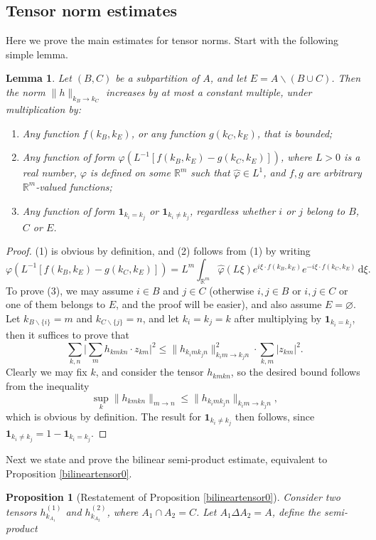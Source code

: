 \documentclass[11 pt,reqno]{amsart}
\newtheorem{prop}[thm]{Proposition}
\newtheorem{lem}[thm]{Lemma}
\theoremstyle{definition}
\theoremstyle{remark}
\numberwithin{equation}{section}
\newcommand{\Rb}{\mathbb{R}}
\begin{document}
{ \subsection{Tensor norm estimates}\label{multi} Here we prove the main estimates for tensor norms. Start with the following simple lemma.
 \begin{lem}\label{adjustment} Let $(B,C)$ be a subpartition of $A$, and let $E=A\backslash (B\cup C)$. Then the norm $\|h\|_{k_B\to k_C}$ increases by at most a constant multiple, under multiplication by:
 \begin{enumerate}[(1)]
 \item Any function $f(k_B,k_E)$, or any function $g(k_C,k_E)$, that is bounded;
 \item Any function of form $\varphi(L^{-1}[f(k_B,k_E)-g(k_C,k_E)])$, where $L>0$ is a real number, $\varphi$ is defined on some $\Rb^m$ such that $\widehat{\varphi}\in L^1$, and $f,g$ are arbitrary $\Rb^m$-valued functions;
 \item Any function of form $\mathbf{1}_{k_i=k_j}$ or $\mathbf{1}_{k_i\neq k_j}$, regardless whether $i$ or $j$ belong to $B$, $C$ or $E$.
 \end{enumerate}
 \end{lem}
 \begin{proof} (1) is obvious by definition, and (2) follows from (1) by writing
 \[\varphi(L^{-1}[f(k_B,k_E)-g(k_C,k_E)])=L^m\int_{\Rb^m}\widehat{\varphi}(L\xi)e^{i\xi\cdot f(k_B,k_E)}e^{-i\xi\cdot f(k_C,k_E)}\,\mathrm{d}\xi.\]
 To prove (3), we may assume $i\in B$ and $j\in C$ (otherwise $i,j\in B$ or $i,j\in C$ or one of them belongs to $E$, and the proof will be easier), and also assume $E=\varnothing$. Let $k_{B\backslash\{i\}}=m$ and $k_{C\backslash\{j\}}=n$, and let $k_i=k_j=k$ after multiplying by $\mathbf{1}_{k_i=k_j}$, then it suffices to prove that
 \[\sum_{k,n}\bigg|\sum_{m}h_{kmkn}\cdot z_{km}\bigg|^2\leq\|h_{k_imk_jn}\|_{k_im\to k_jn}^2\cdot\sum_{k,m}|z_{km}|^2.\] Clearly we may fix $k$, and consider the tensor $h_{kmkn}$, so the desired bound follows from the inequality
 \[\sup_k\|h_{kmkn}\|_{m\to n}\leq \|h_{k_imk_jn}\|_{k_im\to k_jn},\] which is obvious by definition. The result for $\mathbf{1}_{k_i\neq k_j}$ then follows, since $\mathbf{1}_{k_i\neq k_j}=1-\mathbf{1}_{k_i= k_j}$.
 \end{proof} Next we state and prove the bilinear semi-product estimate, equivalent to Proposition \ref{bilineartensor0}.
 \begin{prop}[Restatement of Proposition \ref{bilineartensor0}]\label{bilineartensor} Consider two tensors $h_{k_{A_1}}^{(1)}$ and $h_{k_{A_2}}^{(2)}$, where $A_1\cap A_2=C$. Let $A_1\Delta A_2=A$, define the semi-product

\end{prop}}
\end{document}
